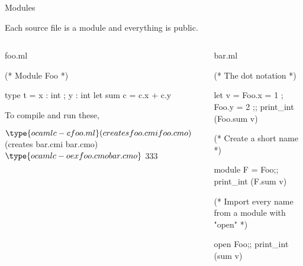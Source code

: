 \documentclass{plt}
\begin{document}
\begin{frame}[fragile]{Modules}

Each source file is a module and everything is public.

\vspace{1pc}

\begin{columns}
  \begin{column}[t]{0.5\textwidth}
foo.ml
\medskip
\begin{ocaml}
(* Module Foo *)

type t = { x : int ; y : int }
let sum c = c.x + c.y
\end{ocaml}

\vspace{1pc}

To compile and run these,

\medskip

\begin{interactive}
$ \type{ocamlc -c foo.ml}
  (creates foo.cmi foo.cmo)
$ 
  (creates bar.cmi bar.cmo)
$ \type{ocamlc -o ex foo.cmo bar.cmo}
$ 
333
\end{interactive}

  \end{column}
  \begin{column}[t]{0.5\textwidth}
bar.ml
\medskip
\begin{ocaml}
(* The dot notation *)

let v = { Foo.x = 1 ;
          Foo.y = 2 };;
print_int (Foo.sum v)

(* Create a short name *)

module F = Foo;;
print_int (F.sum v)

(* Import every name from
   a module with "open" *)

open Foo;;
print_int (sum v)
\end{ocaml}
  \end{column}
\end{columns}

\end{frame}
\end{document}
